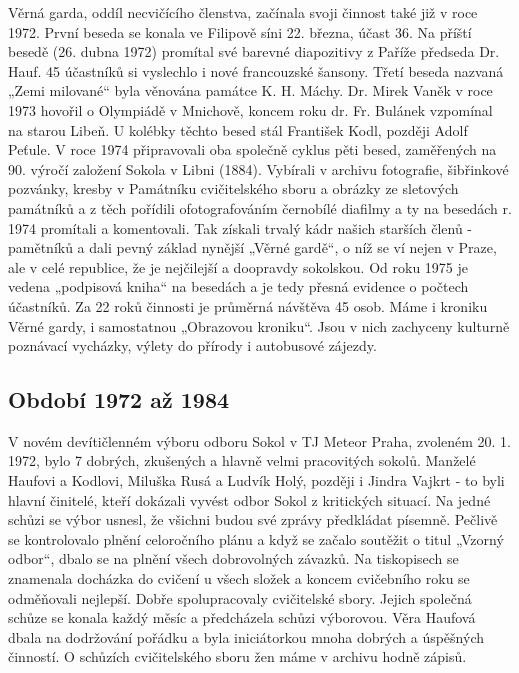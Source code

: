 Věrná garda, oddíl necvičícího členstva, začínala svoji činnost také již
v roce 1972. První beseda se konala ve Filipově síni 22. března, účast
36. Na příští besedě (26. dubna 1972) promítal své barevné diapozitivy z
Paříže předseda Dr. Hauf. 45 účastníků si vyslechlo i nové francouzské
šansony. Třetí beseda nazvaná „Zemi milované`` byla věnována památce K.
H. Máchy. Dr. Mirek Vaněk v roce 1973 hovořil o Olympiádě v Mnichově,
koncem roku dr. Fr. Bulánek vzpomínal na starou Libeň. U kolébky těchto
besed stál František Kodl, později Adolf Peťule. V roce 1974
připravovali oba společně cyklus pěti besed, zaměřených na 90. výročí
založení Sokola v Libni (1884). Vybírali v archivu fotografie,
šibřinkové pozvánky, kresby v Památníku cvičitelského sboru a obrázky ze
sletových památníků a z těch pořídili ofotografováním černobílé diafilmy
a ty na besedách r. 1974 promítali a komentovali. Tak získali trvalý
kádr našich starších členů - pamětníků a dali pevný základ nynější
„Věrné gardě``, o níž se ví nejen v Praze, ale v celé republice, že je
nejčilejší a doopravdy sokolskou. Od roku 1975 je vedena „podpisová
kniha`` na besedách a je tedy přesná evidence o počtech účastníků. Za 22
roků činnosti je průměrná návštěva 45 osob. Máme i kroniku Věrné gardy,
i samostatnou „Obrazovou kroniku``. Jsou v nich zachyceny kulturně
poznávací vycházky, výlety do přírody i autobusové zájezdy.

\subsection{Období 1972 až 1984}\label{obdobuxed-1972-aux17e-1984}

V novém devítičlenném výboru odboru Sokol v TJ Meteor Praha, zvoleném
20. 1. 1972, bylo 7 dobrých, zkušených a hlavně velmi pracovitých
sokolů. Manželé Haufovi a Kodlovi, Miluška Rusá a Ludvík Holý, později i
Jindra Vajkrt - to byli hlavní činitelé, kteří dokázali vyvést odbor
Sokol z kritických situací. Na jedné schůzi se výbor usnesl, že všichni
budou své zprávy předkládat písemně. Pečlivě se kontrolovalo plnění
celoročního plánu a když se začalo soutěžit o titul „Vzorný odbor``,
dbalo se na plnění všech dobrovolných závazků. Na tiskopisech se
znamenala docházka do cvičení u všech složek a koncem cvičebního roku se
odměňovali nejlepší. Dobře spolupracovaly cvičitelské sbory. Jejich
společná schůze se konala každý měsíc a předcházela schůzi výborovou.
Věra Haufová dbala na dodržování pořádku a byla iniciátorkou mnoha
dobrých a úspěšných činností. O schůzích cvičitelského sboru žen máme v
archivu hodně zápisů.

